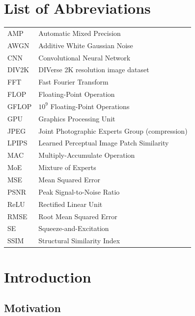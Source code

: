 \documentclass[12pt,a4paper,oneside]{NITR}
\begin{document}
\chapter*{List of Abbreviations}
\begin{tabular}{@{}ll@{}}
AMP    & Automatic Mixed Precision \\
AWGN   & Additive White Gaussian Noise \\
CNN    & Convolutional Neural Network \\
DIV2K  & DIVerse 2K resolution image dataset \\
FFT    & Fast Fourier Transform \\
FLOP   & Floating-Point Operation \\
GFLOP  & $10^9$ Floating-Point Operations \\
GPU    & Graphics Processing Unit \\
JPEG   & Joint Photographic Experts Group (compression) \\
LPIPS  & Learned Perceptual Image Patch Similarity \\
MAC    & Multiply-Accumulate Operation \\
MoE    & Mixture of Experts \\
MSE    & Mean Squared Error \\
PSNR   & Peak Signal-to-Noise Ratio \\
ReLU   & Rectified Linear Unit \\
RMSE   & Root Mean Squared Error \\
SE     & Squeeze-and-Excitation \\
SSIM   & Structural Similarity Index \\
\end{tabular}

\cleardoublepage

\pagestyle{fancy}
\renewcommand{\chaptermark}[1]{\markboth{#1}{}}
\renewcommand{\sectionmark}[1]{\markright{\textbf{Chapter \thechapter}}}
\chapter{Introduction}\label{ch:intro}

\section{Motivation}\label{sec:motivation}
\end{document}
